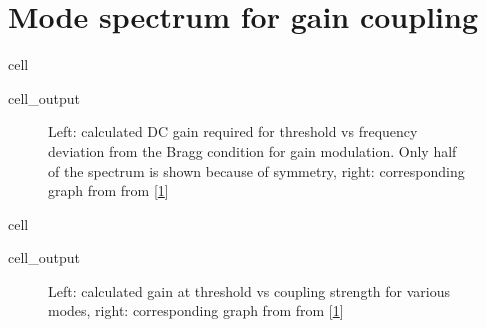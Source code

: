 \documentclass[a4paper,10pt,english,openany,oneside]{jupyterBook}
\begin{document}
\section{Mode spectrum for gain coupling}
\label{\detokenize{Kogelnik-Shank_Coupled-Wave-Theory_DFB-Lasers:mode-spectrum-for-gain-coupling}}
\begin{sphinxuseclass}{cell}\begin{sphinxVerbatimOutput}

\begin{sphinxuseclass}{cell_output}
\begin{figure}[htbp]
\centering
\capstart

\noindent{}
\caption{Left: calculated DC gain required for threshold vs frequency deviation from the Bragg condition for gain modulation. Only half of the spectrum is shown because of symmetry, right: corresponding graph from from {[}\hyperlink{cite.bib:id3}{1}{]}}\label{\detokenize{Kogelnik-Shank_Coupled-Wave-Theory_DFB-Lasers:kogelnik7c}}\end{figure}

\end{sphinxuseclass}\end{sphinxVerbatimOutput}

\end{sphinxuseclass}
\begin{sphinxuseclass}{cell}\begin{sphinxVerbatimOutput}

\begin{sphinxuseclass}{cell_output}
\begin{figure}[htbp]
\centering
\capstart

\noindent{}
\caption{Left: calculated gain at threshold vs coupling strength for various modes, right: corresponding graph from from {[}\hyperlink{cite.bib:id3}{1}{]}}\label{\detokenize{Kogelnik-Shank_Coupled-Wave-Theory_DFB-Lasers:kogelnik8c}}\end{figure}

\end{sphinxuseclass}\end{sphinxVerbatimOutput}

\end{sphinxuseclass}
\end{document}
